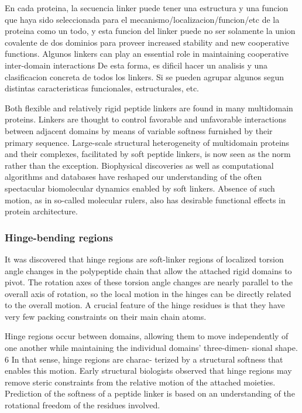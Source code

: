 En cada proteina, la secuencia linker puede tener una estructura y una funcion que haya sido seleccionada para el mecanismo/localizacion/funcion/etc de la proteina como un todo, y esta funcion del linker puede no ser solamente la union covalente de dos dominios para proveer increased stability and new cooperative functions.
Algunos linkers can play an essential role in maintaining cooperative inter-domain interactions
De esta forma, es dificil hacer un analisis y una clasificacion concreta de todos los linkers. Si se pueden agrupar algunos segun distintas caracteristicas funcionales, estructurales, etc.



Both flexible and relatively rigid peptide linkers are found in many multidomain proteins. 
Linkers are thought to control favorable and unfavorable interactions between adjacent domains by means of variable softness
furnished by their primary sequence. Large-scale structural heterogeneity of multidomain proteins
and their complexes, facilitated by soft peptide linkers, is now seen as the norm rather than the
exception. Biophysical discoveries as well as computational algorithms and databases have
reshaped our understanding of the often spectacular biomolecular dynamics enabled by soft linkers.
Absence of such motion, as in so-called molecular rulers, also has desirable functional effects in
protein architecture.


\subsubsection{Hinge-bending regions}
It was discovered that hinge regions are
soft-linker regions of localized torsion angle changes in
the polypeptide chain that allow the attached rigid
domains to pivot. The rotation axes of these torsion
angle changes are nearly parallel to the overall axis of
rotation, so the local motion in the hinges can be
directly related to the overall motion. A crucial feature
of the hinge residues is that they have very few packing
constraints on their main chain atoms.

Hinge regions occur between domains, allowing
them to move independently of one another while
maintaining the individual domains’ three-dimen-
sional shape. 6 In that sense, hinge regions are charac-
terized by a structural softness that enables this
motion.
Early structural biologists observed that
hinge regions may remove steric constraints from the
relative motion of the attached moieties.
Prediction of the softness of a peptide linker is
based on an understanding of the rotational freedom
of the residues involved.

